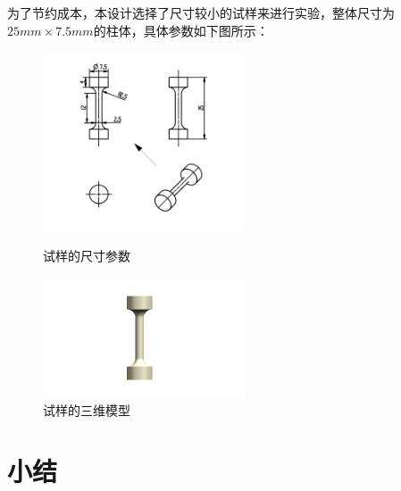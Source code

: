 为了节约成本，本设计选择了尺寸较小的试样来进行实验，整体尺寸为$ 25mm\times 7.5mm $的柱体，具体参数如下图所示：
\begin{figure}[htbp]
	\centering
	\begin{minipage}[t]{0.68\textwidth}
		\centering
		\includegraphics[width=6cm]{pic/试样}
		\caption{试样的尺寸参数}
		\label{fig:试样尺寸}
	\end{minipage}
	\begin{minipage}[t]{0.3\textwidth}
		\centering
		\includegraphics[width=6cm]{pic/模型}
		\caption{试样的三维模型}
		\label{fig:试样的三维模型}
	\end{minipage}
\end{figure}




\section{小结}
